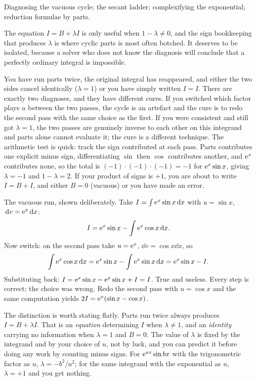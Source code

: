 \begin{seealsob}Diagnosing the vacuous cycle; the secant ladder; complexifying the exponential; reduction formulae by parts.\end{seealsob}

The equation $I=B+\lambda I$ is only useful when $1-\lambda\neq0$, and the sign bookkeeping that produces $\lambda$ is where cyclic parts is most often botched. It deserves to be isolated, because a solver who does not know the diagnosis will conclude that a perfectly ordinary integral is impossible.

\cue You have run parts twice, the original integral has reappeared, and either the two sides cancel identically ($\lambda=1$) or you have simply written $I=I$.
\method There are exactly two diagnoses, and they have different cures. If you switched which factor plays $u$ between the two passes, the cycle is an artefact and the cure is to redo the second pass with the same choice as the first. If you were consistent and still got $\lambda=1$, the two passes are genuinely inverse to each other on this integrand and parts alone cannot evaluate it; the cure is a different technique. The arithmetic test is quick: track the sign contributed at each pass. Parts contributes one explicit minus sign, differentiating $\sin$ then $\cos$ contributes another, and $\mathrm{e}^{x}$ contributes none, so the total is $(-1)\cdot(-1)\cdot(-1)=-1$ for $\mathrm{e}^{x}\sin x$, giving $\lambda=-1$ and $1-\lambda=2$. If your product of signs is $+1$, you are about to write $I=B+I$, and either $B=0$ (vacuous) or you have made an error.

\begin{worked}
The vacuous run, shown deliberately. Take $I=\int\mathrm{e}^{x}\sin x\,\mathrm{d} x$ with $u=\sin x$, $\,\mathrm{d} v=\mathrm{e}^{x}\,\mathrm{d} x$:
\[I=\mathrm{e}^{x}\sin x-\int\mathrm{e}^{x}\cos x\,\mathrm{d} x.\]
Now switch: on the second pass take $u=\mathrm{e}^{x}$, $\dd v=\cos x\dd x$, so
\[\int\mathrm{e}^{x}\cos x\,\mathrm{d} x=\mathrm{e}^{x}\sin x-\int\mathrm{e}^{x}\sin x\,\mathrm{d} x=\mathrm{e}^{x}\sin x-I.\]
Substituting back: $I=\mathrm{e}^{x}\sin x-\mathrm{e}^{x}\sin x+I=I$. True and useless. Every step is correct; the choice was wrong. Redo the second pass with $u=\cos x$ and the same computation yields $2I=\mathrm{e}^{x}(\sin x-\cos x)$.
\end{worked}

\begin{keynote}
The distinction is worth stating flatly. Parts run twice always produces $I=B+\lambda I$. That is an \emph{equation} determining $I$ when $\lambda\neq1$, and an \emph{identity} carrying no information when $\lambda=1$ and $B=0$. The value of $\lambda$ is fixed by the integrand and by your choice of $u$, not by luck, and you can predict it before doing any work by counting minus signs. For $\mathrm{e}^{ax}\sin bx$ with the trigonometric factor as $u$, $\lambda=-b^{2}/a^{2}$; for the same integrand with the exponential as $u$, $\lambda=+1$ and you get nothing.
\end{keynote}


